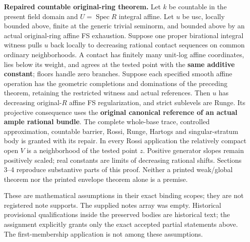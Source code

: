 \documentclass[
  10pt,
]{article}
\begin{document}
\textbf{Repaired countable original-ring theorem.} Let \(k\) be
countable in the present field domain and \(U=\operatorname{Spec}R\)
integral affine. Let \(u\) be usc, locally bounded above, finite at the
generic trivial seminorm, and bounded above by an actual original-ring
affine FS exhaustion. Suppose one proper birational integral witness
pulls \(u\) back locally to decreasing rational contact sequences on
common ordinary neighborhoods. A contact has finitely many unit-log
affine coordinates, lies below its weight, and agrees at the tested
point with the \textbf{same additive constant}; floors handle zero
branches. Suppose each specified smooth affine operation has the
geometric completions and dominations of the preceding theorem,
retaining the restricted witness and actual references. Then \(u\) has
decreasing original-\(R\) affine FS regularization, and strict sublevels
are Runge. Its projective consequence uses the \textbf{original
canonical reference of an actual ample rational bundle}. The complete
whole-base trace, controlled approximation, countable barrier, Rossi,
Runge, Hartogs and singular-stratum body is granted with its repair. In
every Rossi application the relatively compact open \(V\) is a
neighborhood of the tested point \(z\). Positive generator slopes remain
positively scaled; real constants are limits of decreasing rational
shifts. Sections 3--4 reproduce substantive parts of this proof. Neither
a printed weak/global theorem nor the printed envelope theorem alone is
a premise.

These are mathematical assumptions in their exact binding scopes; they
are not registered note supports. The supplied notes array was empty.
Historical provisional qualifications inside the preserved bodies are
historical text; the assignment explicitly grants only the exact
accepted partial statements above. The first-membership application is
not among these assumptions.
\end{document}
